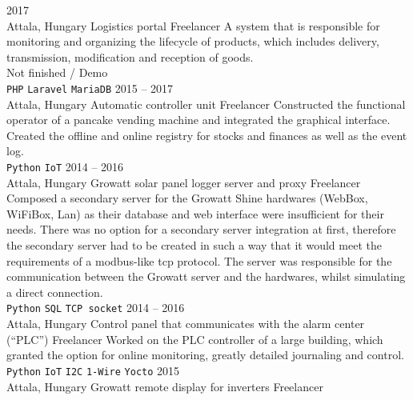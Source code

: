 \documentclass[9pt]{developercv} %
\begin{document}
\begin{entrylist}
    \entry
        {2017 \\ Attala, Hungary}
        {Logistics portal}
        {Freelancer}
        {A system that is responsible for monitoring and organizing the lifecycle of products, which includes delivery,
            transmission, modification and reception of goods.\\
            Not finished / Demo \\
            \texttt{PHP}\slashsep
            \texttt{Laravel}\slashsep
            \texttt{MariaDB}
        }
    \entry
        {2015 -- 2017 \\ Attala, Hungary}
        {Automatic controller unit}
        {Freelancer}
        {Constructed the functional operator of a pancake vending machine and integrated the graphical interface. Created the
            offline and online registry for stocks and finances as well as the event log.\\
            \texttt{Python}\slashsep
            \texttt{IoT}
        }
    \entry
        {2014 -- 2016 \\ Attala, Hungary}
        {Growatt solar panel logger server and proxy}
        {Freelancer}
        {Composed a secondary server for the Growatt Shine hardwares (WebBox, WiFiBox, Lan) as their database and web
            interface were insufficient for their needs. There was no option for a secondary server integration at first, therefore the
            secondary server had to be created in such a way that it would meet the requirements of a modbus-like tcp protocol.
            The server was responsible for the communication between the Growatt server and the hardwares, whilst simulating a
            direct connection. \\
            \texttt{Python}\slashsep
            \texttt{SQL}\slashsep
            \texttt{TCP socket}
        }
    \entry
        {2014 -- 2016 \\ Attala, Hungary}
        {Control panel that communicates with the alarm center (“PLC”)}
        {Freelancer}
        {Worked on the PLC controller of a large building, which granted the option for online monitoring, greatly detailed
            journaling and control. \\ 
            \texttt{Python}\slashsep
            \texttt{IoT}\slashsep
            \texttt{I2C}\slashsep
            \texttt{1-Wire}\slashsep
            \texttt{Yocto}
        }
    \entry
        {2015 \\ Attala, Hungary}
        {Growatt remote display for inverters}
        {Freelancer}

\end{entrylist}
\end{document}
